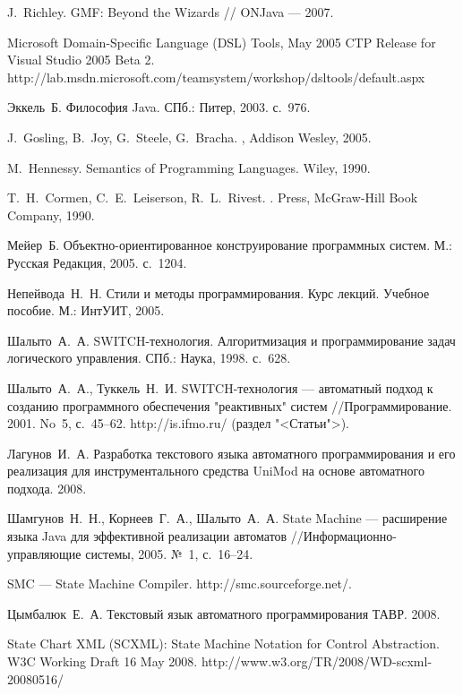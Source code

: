 \documentclass[a4paper,12pt]{article}
\begin{document}
\begin{thebibliography}{99}
J.~Richley.
GMF: Beyond the Wizards
// ONJava --- 2007.

Microsoft Domain-Specific Language (DSL) Tools, May
2005 CTP Release for Visual Studio 2005 Beta 2.
http://lab.msdn.microsoft.com/teamsystem/workshop/dsltools/default.aspx

Эккель~Б.
Философия Java.
СПб.: Питер, 2003. с.~976.

J.~Gosling, B.~Joy, G.~Steele, G.~Bracha.
,
Addison Wesley, 2005.

M.~Hennessy.
Semantics of Programming Languages.
Wiley, 1990.

T.~H.~Cormen, C.~E.~Leiserson, R.~L.~Rivest.
.
 Press, McGraw-Hill Book Company, 1990.

Мейер~Б.
Объектно-ориентированное конструирование программных систем.
М.: Русская Редакция, 2005. с.~1204.

Непейвода~Н.~Н.
Стили и методы программирования. Курс лекций. Учебное пособие.
М.: ИнтУИТ, 2005.

Шалыто~А.~А.
SWITCH-технология. Алгоритмизация и программирование задач логического управления.
СПб.: Наука, 1998. с.~628.

Шалыто~А.~А., Туккель~Н.~И.
SWITCH-технология --- автоматный подход к созданию программного обеспечения "реактивных" систем
//Программирование. 2001. No~5, с.~45--62. http://is.ifmo.ru/ (раздел "<Статьи">).

Лагунов~И.~А.
Разработка текстового языка автоматного программирования и его реализация для инструментального средства UniMod на основе автоматного подхода.
2008.

Шамгунов~Н.~Н., Корнеев~Г.~А., Шалыто~А.~А.
State Machine --- расширение языка Java для эффективной реализации автоматов
//Информационно-управляющие системы, 2005. №~1, с.~16--24.

SMC --- State Machine Compiler. http://smc.sourceforge.net/.

Цымбалюк~Е.~А.
Текстовый язык автоматного программирования ТАВР.
2008.

State Chart XML (SCXML): State Machine Notation for Control Abstraction.
W3C Working Draft 16 May 2008.
http://www.w3.org/TR/2008/WD-scxml-20080516/


\end{thebibliography}
\end{document}
